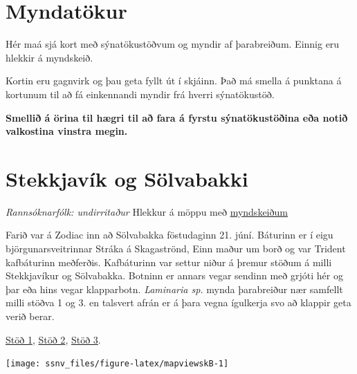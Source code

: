 \documentclass[icelandic,]{book}
\begin{document}
\hypertarget{results}{%
\chapter{Myndatökur}\label{results}}

Hér maá sjá kort með sýnatökustöðvum og myndir af þarabreiðum. Einnig eru hlekkir á myndskeið.

Kortin eru gagnvirk og þau geta fyllt út í skjáinn. Það má smella á punktana á kortunum til að fá einkennandi myndir frá hverri sýnatökustöð.

\textbf{Smellið á örina til hægri til að fara á fyrstu sýnatökustöðina eða notið valkostina vinstra megin.}

\hypertarget{stekkjavik-og-solvabakki}{%
\chapter*{Stekkjavík og Sölvabakki}\label{stekkjavik-og-solvabakki}}

\emph{Rannsóknarfólk: undirritaður} Hlekkur á möppu með \href{https://www.dropbox.com/sh/pcobg1zexnhsm9r/AABOmyp9I87GbuT6qs3SRxWDa?dl=0}{myndskeiðum}

Farið var á Zodiac inn að Sölvabakka föstudaginn 21. júní. Báturinn er í eigu björgunarsveitrinnar Stráka á Skagaströnd, Einn maður um borð og var Trident kafbáturinn meðferðis. Kafbáturinn var settur niður á þremur stöðum á milli Stekkjavíkur og Sölvabakka. Botninn er annars vegar sendinn með grjóti hér og þar eða hins vegar klapparbotn. \emph{Laminaria sp.} mynda þarabreiður nær samfellt milli stöðva 1 og 3. en talsvert afrán er á þara vegna ígulkerja svo að klappir geta verið berar.

\href{https://www.dropbox.com/s/6eh4ntihn256yt7/Trident-Jun-21-115230-HQ.mp4?dl=0}{Stöð 1},
\href{https://www.dropbox.com/s/y25irxzi70btw6s/Trident-Jun-21-122032-HQ.mp4?dl=0}{Stöð 2},
\href{https://www.dropbox.com/s/u30ejcqt9aw63d2/Trident-Jun-21-133207-HQ.mp4?dl=0}{Stöð 3}.

\begin{center}\texttt{[image: ssnv\_files/figure-latex/mapviewskB-1]} \end{center}
\end{document}
